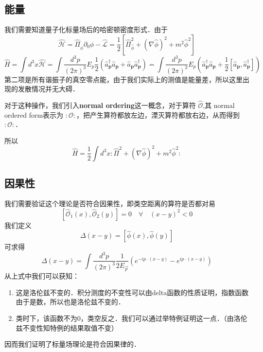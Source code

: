 \subsection{能量}
我们需要知道量子化标量场后的哈密顿密度形式．由于
\begin{equation}
\hat{\mathcal{H}}=\hat{\Pi}_{\hat{\phi}} \partial_{0} \hat{\phi}-\hat{\mathcal{L}}=\frac{1}{2}\left[\hat{\Pi}_{\hat{\phi}}^{2}+(\nabla \hat{\phi})^{2}+m^{2} \hat{\phi}^{2}\right]
\end{equation}
\begin{equation}
\hat{H}=\int d^{3} x \hat{\mathcal{H}}=\int \frac{d^{3} p}{(2 \pi)^{3}} E_{p} \frac{1}{2}\left(\hat{a}_{\mathbf{p}}^{\dagger} \hat{a}_{\mathbf{p}}+\hat{a}_{\mathbf{p}} \hat{a}_{\mathbf{p}}^{\dagger}\right)=\int \frac{d^{3} p}{(2 \pi)^{3}} E_{p}\left(\hat{a}_{\mathbf{p}}^{\dagger} \hat{a}_{\mathbf{p}}+\frac{1}{2}\left[\hat{a}_{\mathbf{p}}, \hat{a}_{\mathbf{p}}^{\dagger}\right]\right)
\end{equation}
第二项是所有谐振子的真空零点能，由于我们实际上的测值是能量差，所以这里出现的发散情况并无大碍．

对于这种操作，我们引入\textbf{normal ordering}这一概念，对于算符 $\hat{\mathcal{O}}$,其 normal ordered form表示为 $:\mathcal{O}:$，把产生算符都放左边，湮灭算符都放右边，从而得到 $:\mathcal{O}:$．

所以
\begin{equation}
\hat{H}=\frac{1}{2} \int d^{3} x: \hat{\Pi}^{2}+(\nabla \hat{\phi})^{2}+m^{2} \hat{\phi}^{2}:
\end{equation}

\subsection{因果性}
我们需要验证这个理论是否符合因果性，即类空距离的算符是否都对易
\begin{equation}
\left[\mathcal{\hat{O}}_{1}(x), \mathcal{\hat{O}}_{2}(y)\right]=0 \quad \forall \quad(x-y)^{2}<0
\end{equation}
我们定义
\begin{equation}
\Delta(x-y)=[\hat{\phi}(x), \hat{\phi}(y)]
\end{equation}
可求得
\begin{equation}
\Delta(x-y)=\int \frac{d^{3} p}{(2 \pi)^{3}} \frac{1}{2 E_{\vec{p}}}\left(e^{-i p \cdot(x-y)}-e^{i p \cdot(x-y)}\right)
\end{equation}
从上式中我们可以获知：
\begin{enumerate}
\item 这是洛伦兹不变的．积分测度的不变性可以由delta函数的性质证明，指数函数由于是数，所以也是洛伦兹不变的．
\item 类时下，该函数不为0，类空反之．我们可以通过举特例证明这一点．（由洛伦兹不变性知特例的结果取值不变）
\end{enumerate}
因而我们证明了标量场理论是符合因果律的．

